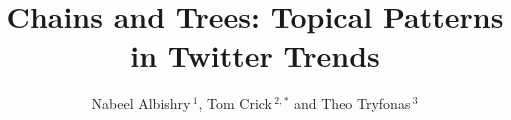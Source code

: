 \documentclass[utf8]{frontiersSCNS} %
\def\firstAuthorLast{Albishry {et~al.}} %
\def\Authors{Nabeel Albishry\,$^{1}$, Tom Crick\,$^{2,*}$ and Theo Tryfonas\,$^{3}$}
\begin{document}
\onecolumn
{}

\title[Chains and Trees: Topical Patterns in Twitter Trends]{Chains and Trees: Topical Patterns in Twitter Trends} 

\author[\firstAuthorLast ]{\Authors} %
\address{} %
\correspondance{} %

\extraAuth{}%


\maketitle
\end{document}
